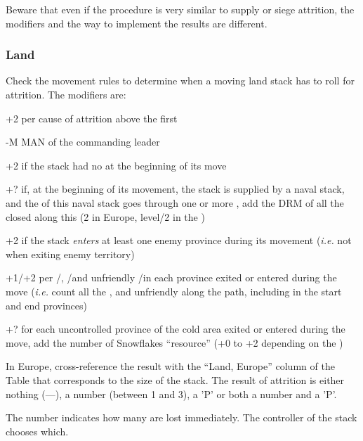 Beware that even if the procedure is very similar to supply or siege
attrition, the modifiers and the way to implement the results are different.

\subsubsection{Land}
Check the movement rules to determine when a moving land stack has to roll for
attrition. The modifiers are:
\begin{modlist}
\item[+2] per cause of attrition above the first
\item[-M] MAN of the commanding leader
\item[+2] if the stack had no \LoS at the beginning of its move
\item[+?] if, at the beginning of its movement, the stack is supplied by a
  naval stack, and the \LoS of this naval stack goes through one or more
  \StraitFort, add the DRM of all the closed \StraitFort along this \LoS (2 in
  Europe, level/2 in the \ROTW)
\item[+2] if the stack \emph{enters} at least one enemy province during its
  movement (\emph{i.e.}  not when exiting enemy territory)
\item[+1/+2] per \PILLAGE\Facemoins/\Faceplus, \REVOLT\Facemoins/\Faceplus and
  unfriendly \REBELLION\Facemoins/\Faceplus in each province exited or entered
  during the move (\emph{i.e.} count all the \PILLAGE, \REVOLT and unfriendly
  \REBELLION along the path, including in the start and end provinces)
\item[+?] for each uncontrolled province of the \ROTW cold area exited or
  entered during the move, add the number of Snowflakes ``resource'' (+0 to +2
  depending on the \Area)
\end{modlist}

In Europe, cross-reference the result with the ``Land, Europe'' column of the
Table that corresponds to the size of the stack. The result of attrition is
either nothing (---), a number (between 1 and 3), a 'P' or both a number and a
'P'.

The number indicates how many \LD are lost immediately. The controller of the
stack chooses which.

